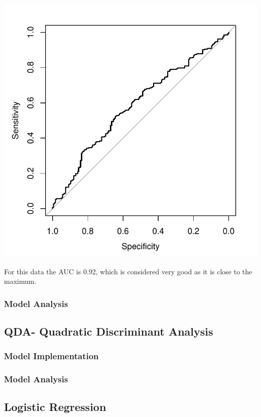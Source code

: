 \documentclass[]{report}
\begin{document}
\begin{center}
	\includegraphics{Figures/lda_roc.pdf}
\end{center}

For this data the AUC is 0.92, which is considered very good as it is close to the maximum.

\subsubsection{Model Analysis}


\subsection{QDA- Quadratic Discriminant Analysis}

\subsubsection{Model Implementation}
\subsubsection{Model Analysis}


\subsection{Logistic Regression}
\end{document}
